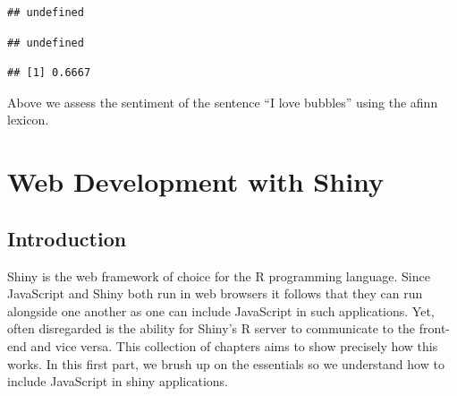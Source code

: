 \documentclass[
]{krantz}
\makeatletter
\newenvironment{Shaded}{\begin{snugshade}}{\end{snugshade}}
\newcommand{\KeywordTok}[1]{\textcolor[rgb]{0.27,0.27,0.27}{\textbf{#1}}}
\newcommand{\NormalTok}[1]{#1}
\newcommand{\OperatorTok}[1]{\textcolor[rgb]{0.43,0.43,0.43}{\textbf{#1}}}
\newcommand{\StringTok}[1]{\textcolor[rgb]{0.5,0.5,0.5}{#1}}
\newenvironment{kframe}{%
\medskip{}
\setlength{\fboxsep}{.8em}
 \def\at@end@of@kframe{}%
 \ifinner\ifhmode%
  \def\at@end@of@kframe{\end{minipage}}%
  \begin{minipage}{\columnwidth}%
 \fi\fi%
 \def\FrameCommand##1{\hskip\@totalleftmargin \hskip-\fboxsep
 \colorbox{shadecolor}{##1}\hskip-\fboxsep
     \hskip-\linewidth \hskip-\@totalleftmargin \hskip\columnwidth}%
 \MakeFramed {\advance\hsize-\width
   \@totalleftmargin\z@ \linewidth\hsize
   \@setminipage}}%
 {\par\unskip\endMakeFramed%
 \at@end@of@kframe}
\renewenvironment{Shaded}{\begin{kframe}}{\end{kframe}}
\makeatother
\begin{document}
\begin{verbatim}
## undefined
\end{verbatim}

\begin{Shaded}
\end{Shaded}

\begin{verbatim}
## undefined
\end{verbatim}

\begin{Shaded}
\end{Shaded}

\begin{verbatim}
## [1] 0.6667
\end{verbatim}

Above we assess the sentiment of the sentence ``I love bubbles'' using the afinn lexicon.

\hypertarget{part-web-development-with-shiny}{%
\part{Web Development with Shiny}\label{part-web-development-with-shiny}}

\hypertarget{introduction-1}{%
\chapter{Introduction}\label{introduction-1}}

Shiny is the web framework of choice for the R programming language. Since JavaScript and Shiny both run in web browsers it follows that they can run alongside one another as one can include JavaScript in such applications. Yet, often disregarded is the ability for Shiny's R server to communicate to the front-end and vice versa. This collection of chapters aims to show precisely how this works. In this first part, we brush up on the essentials so we understand how to include JavaScript in shiny applications.
\end{document}
